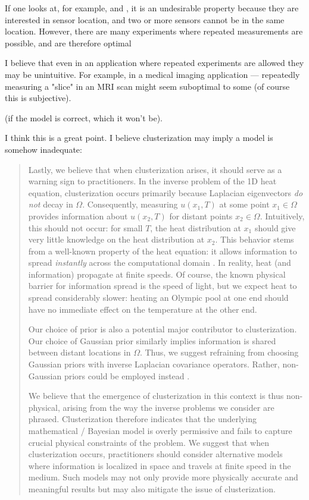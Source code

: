\RC If one looks at, for example, \cite{fedorov1996} and
\cite{nyberg2012}, it is an undesirable property because they are
interested in sensor location, and two or more sensors cannot be in
the same location. However, there are many experiments where repeated
measurements are possible, and are therefore optimal

\AR I believe that even in an application where repeated experiments
are allowed they may be unintuitive. For example, in a medical imaging
application --- repeatedly measuring a "slice" in an MRI scan might
seem suboptimal to some (of course this is subjective).



\RC (if the model is correct, which it won’t be).

\AR I think this is a great point. I believe clusterization may imply
a model is somehow inadequate:

\begin{quote}
  Lastly, we believe that when clusterization arises, it should
  serve as a warning sign to practitioners. In the inverse problem of
  the 1D heat equation, clusterization occurs primarily because
  Laplacian eigenvectors \emph{do not} decay in
  $\Omega$. Consequently, measuring $u(x_1, T)$ at some point $x_1 \in
  \Omega$ provides information about $u(x_2,T)$ for distant points
  $x_2 \in \Omega$. Intuitively, this should not occur: for small $T$,
  the heat distribution at $x_1$ should give very little knowledge on
  the heat distribution at $x_2$. This behavior stems from a
  well-known property of the heat equation: it allows information to
  spread \emph{instantly} across the computational domain
  \cite{renardy2006PDE}. In reality, heat (and information) propagate
  at finite speeds. Of course, the known physical barrier for
  information spread is the speed of light, but we expect heat to
  spread considerably slower: heating an Olympic pool at one end
  should have no immediate effect on the temperature at the other end.
  
  Our choice of prior is also a potential major contributor to
  clusterization. Our choice of Gaussian prior similarly implies
  information is shared between distant locations in $\Omega$. Thus,
  we suggest refraining from choosing Gaussian priors with inverse
  Laplacian covariance operators. Rather, non-Gaussian priors could be
  employed instead \cite{hosseini2017, hosseini2019}.

  We believe that the emergence of clusterization in this context is
  thus non-physical, arising from the way the inverse problems we
  consider are phrased. Clusterization therefore indicates that the
  underlying mathematical / Bayesian model is overly permissive and
  fails to capture crucial physical constraints of the problem. We
  suggest that when clusterization occurs, practitioners should
  consider alternative models where information is localized in space
  and travels at finite speed in the medium. Such models may not only
  provide more physically accurate and meaningful results but may also
  mitigate the issue of clusterization.
\end{quote}



